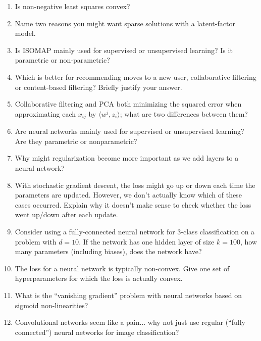 \documentclass{article}
\def\enum#1{\begin{enumerate}#1\end{enumerate}}
\begin{document}
\enum{
\item Is non-negative least squares convex?
\item Name two reasons you might want sparse solutions with a latent-factor model.
\item Is ISOMAP mainly used for supervised or unsupervised learning? Is it parametric or non-parametric?
\item Which is better for recommending moves to a new user, collaborative filtering or content-based filtering? Briefly justify your answer.
\item Collaborative filtering and PCA both minimizing the squared error when approximating each $x_{ij}$ by $\langle w^j, z_i\rangle$; what are two differences between them?
\item{Are neural networks mainly used for supervised or unsupervised learning? Are they parametric or nonparametric?}
\item{Why might regularization become more important as we add layers to a neural network?}
\item With stochastic gradient descent, the loss might go up or down each time the parameters are updated. However, we don't actually know which of these cases occurred. Explain why it doesn't make sense to check whether the loss went up/down after each update.
\item{Consider using a fully-connected neural network for 3-class classification on a problem with $d=10$. If the network has one hidden layer of size $k=100$, how many parameters (including biases), does the network have?}
\item{The loss for a neural network is typically non-convex. Give one set of hyperparameters for which the loss is actually convex.}
\item What is the ``vanishing gradient'' problem with neural networks based on sigmoid non-linearities?
\item{Convolutional networks seem like a pain... why not just use regular (``fully connected'') neural networks for image classification?}
}
\end{document}
